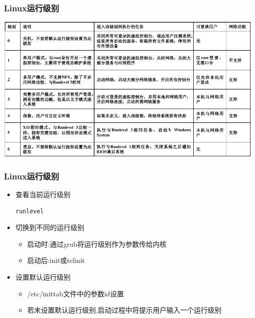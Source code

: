 \documentclass[xcolor=svgnames,presentation]{beamer}
\begin{document}
\begin{frame}
\frametitle{Linux运行级别}
\label{sec-1-4}

\includegraphics[width=.9\linewidth]{img/runlevels.png}
\end{frame}
\begin{frame}[fragile]
\frametitle{Linux运行级别}
\label{sec-1-5}
\begin{itemize}

\item 查看当前运行级别\\
\label{sec-1-5-1}%
\begin{verbatim}
runlevel
\end{verbatim}

\item 切换到不同的运行级别
\label{sec-1-5-2}%
\begin{itemize}

\item 启动时:通过grub将运行级别作为参数传给内核
\label{sec-1-5-2-1}%

\item 启动后:init或telinit
\label{sec-1-5-2-2}%
\end{itemize} %

\item 设置默认运行级别
\label{sec-1-5-3}%
\begin{itemize}

\item /etc/inittab文件中的参数id设置
\label{sec-1-5-3-1}%

\item 若未设置默认运行级别,启动过程中将提示用户输入一个运行级别
\label{sec-1-5-3-2}%
\end{itemize} %
\end{itemize} %
\end{frame}
\end{document}
